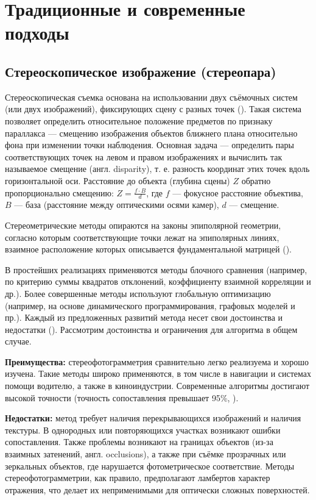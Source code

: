 \section{Традиционные и современные подходы}

\subsection{Стереоскопическое изображение (стереопара)}

Стереоскопическая съемка  основана на использовании двух съёмочных систем (или
двух изображений), фиксирующих сцену с разных точек (\cite{ussr1981phototech}).
Такая система позволяет определить относительное положение предметов по признаку
параллакса — смещению изображения объектов ближнего плана относительно фона при
изменении точки наблюдения.  Основная задача — определить пары соответствующих
точек на левом и правом изображениях и вычислить так называемое смещение (англ.
disparity), т. е.  разность координат этих точек вдоль горизонтальной оси.
Расстояние до объекта (глубина сцены) $Z$ обратно пропорционально смещению: $Z =
\frac{f \cdot B}{d}$, где $f$ — фокусное расстояние объектива, $B$ — база
(расстояние между оптическими осями камер), $d$ — смещение.

Стереометрические методы опираются на законы эпиполярной геометрии,
согласно которым соответствующие точки лежат на эпиполярных линиях, взаимное
расположение которых описывается фундаментальной матрицей (\cite{Hartley:2003:MVG:861369}).

В простейших реализациях применяются методы блочного сравнения (например, по
критерию суммы квадратов отклонений, коэффициенту взаимной корреляции и др.).
Более совершенные методы используют глобальную оптимизацию (например, на основе
динамического программирования, графовых моделей и пр.). Каждый из предложенных
развитий метода несет свои достоинства и недостатки
(\cite{kok2019reviewonsterevision}). Рассмотрим достоинства и ограничения
для алгоритма в общем случае.

\textbf{Преимущества:} стереофотограмметрия сравнительно легко реализуема и
хорошо изучена. Такие методы широко применяются, в том числе в навигации и
системах помощи водителю, а также в киноиндустрии. Современные алгоритмы
достигают высокой точности (точность сопоставления превышает 95\%,
\cite{fsian2022comparisonstereomatchingalgorithms}).

\textbf{Недостатки:} метод требует наличия перекрывающихся изображений и
наличия текстуры. В однородных или повторяющихся участках возникают ошибки
сопоставления. Также проблемы возникают на границах объектов (из-за взаимных
затенений, англ. occlusions), а также при съёмке прозрачных или зеркальных
объектов, где нарушается фотометрическое соответствие. Методы
стереофотограмметрии, как правило, предполагают ламбертов характер отражения,
что делает их неприменимыми для оптически сложных поверхностей.

